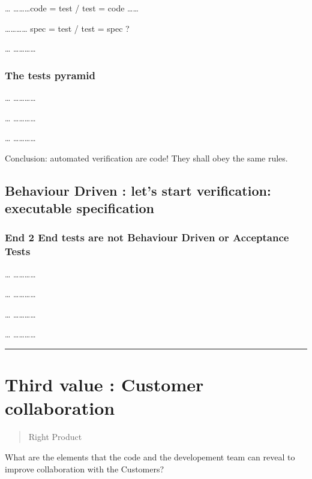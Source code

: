 \ldots{} \ldots{}\ldots{}\ldots{}code = test / test = code
\ldots{}\ldots{}

\ldots{}\ldots{}\ldots{}\ldots{} spec = test / test = spec ?

\ldots{} \ldots{}\ldots{}\ldots{}\ldots{}

\subsubsection{The tests pyramid}\label{the-tests-pyramid}

\ldots{} \ldots{}\ldots{}\ldots{}\ldots{}

\ldots{} \ldots{}\ldots{}\ldots{}\ldots{}

\ldots{} \ldots{}\ldots{}\ldots{}\ldots{}

Conclusion: automated verification are code! They shall obey the same
rules.

\subsection{Behaviour Driven : let's start verification: executable
specification}\label{behaviour-driven-lets-start-verification-executable-specification}

\subsubsection{End 2 End tests are not Behaviour Driven or Acceptance
Tests}\label{end-2-end-tests-are-not-behaviour-driven-or-acceptance-tests}

\ldots{} \ldots{}\ldots{}\ldots{}\ldots{}

\ldots{} \ldots{}\ldots{}\ldots{}\ldots{}

\ldots{} \ldots{}\ldots{}\ldots{}\ldots{}

\ldots{} \ldots{}\ldots{}\ldots{}\ldots{}

\begin{center}\rule{3in}{0.4pt}\end{center}

\section{Third value : Customer
collaboration}\label{third-value-customer-collaboration}

\begin{quote}
Right Product
\end{quote}

What are the elements that the code and the developement team can reveal
to improve collaboration with the Customers?

